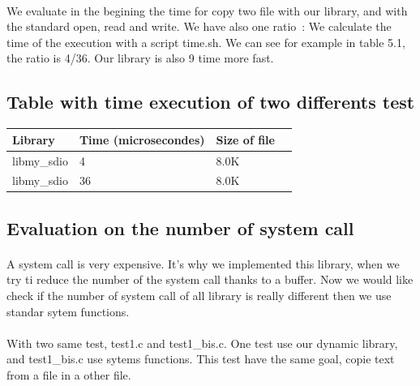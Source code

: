 \documentclass[a4paper,10pt]{article}
\begin{document}
 \paragraph{}
 We evaluate in the begining the time for copy two file with our library, 
 and with the standard open, read and write. We have also one ratio~: 
 We calculate the time of the execution with a script time.sh. We can see
 for example in table 5.1, the ratio is 4/36. Our library is also 9 time
 more fast. 

 \subsection{Table with time execution of two differents test}
 \begin{tabular}{|R{2cm}|C{2cm}|L{1.5cm}|L{1.5cm}|}
 \hline {}Library & Time (microsecondes) & Size of file\\
 \hline  libmy\_sdio & 4 & 8.0K \\
 \hline  libmy\_sdio & 36 & 8.0K \\
 \hline 
 \end{tabular}
 
\subsection{Evaluation on the number of system call}
\paragraph{}
A system call is very expensive. It's why we implemented this library, when
we try ti reduce the number of the system call thanks to a buffer. 
Now we would like check if the number of system call of all library is 
really different then we use standar sytem functions.
\paragraph{}
With two same test, test1.c and test1\_bis.c. One test use our dynamic library, 
and test1\_bis.c use sytems functions. This test have the same goal, copie
text from a file in a other file.
\end{document}
